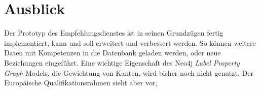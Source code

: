 \section{Ausblick}\label{ausblick}

Der Prototyp des Empfehlungsdienstes ist in seinen Grundzügen fertig implementiert, kann und soll erweitert und verbessert werden. So können weitere Daten mit Kompetenzen in die Datenbank geladen werden, oder neue Beziehungen eingeführt. Eine wichtige Eigenschaft des Neo4j \textit{Label Property Graph} Models, die Gewichtung von Kanten, wird bisher noch nicht genutzt. Der Europäische Qualifikationsrahmen sieht aber vor,  